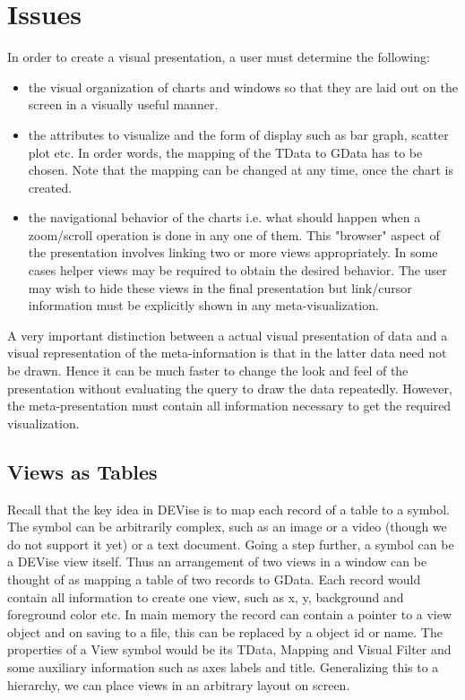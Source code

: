 \section{Issues}
\label{sec:issues}

In order to create a visual presentation, a user must determine the following:
\begin{itemize}
\item the visual organization of charts and windows so that they are laid 
out on the screen in a visually useful manner.
\item the attributes to visualize and the form of display such as bar graph,
scatter plot etc. In order words, the mapping of the TData to GData has
to be chosen. Note that the mapping can be changed at any time, once
the chart is created.
\item the navigational behavior of the charts i.e. what should happen when 
a zoom/scroll operation is done in any one of them. This "browser" aspect of
the presentation involves linking two or more views appropriately. In some 
cases helper views may be required to obtain the desired behavior. The user may
wish to hide these views in the final presentation but link/cursor information
must be explicitly shown in any meta-visualization.
\end{itemize}

A very important distinction between a actual visual presentation of data
and a visual representation of the meta-information is that in the latter
data need not be drawn. Hence it can be much faster to change the look and feel
of the presentation without evaluating the query to draw the data repeatedly.
However, the meta-presentation must contain all information necessary to get 
the required visualization.

\subsection{Views as Tables}

Recall that the key idea in DEVise is to map each record of a table to
a symbol. The symbol can be arbitrarily complex, such as an image or 
a video (though we do not support it yet) or a text document. Going a 
step further, a symbol can be a DEVise view itself. Thus an arrangement
of two views in a window can be thought of as mapping a table
of two records to GData. Each record would contain all information
to create one view, such as x, y, background and foreground color etc.
In main memory the record can  contain a pointer to a view object and
on saving to a file, this can be replaced by a object id or name. The
properties of a View symbol would be its TData, Mapping and Visual Filter
and some auxiliary information such as axes labels and title. Generalizing
this to a hierarchy, we can place views in an arbitrary layout on screen.

